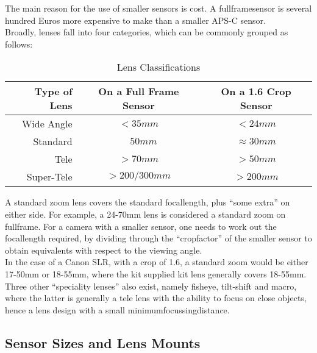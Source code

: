 The main reason for the use of smaller \glspl{sensor} is cost. A \gls{fullframesensor} is several hundred Euros more expensive to make than a smaller \gls{APS-C} \gls{sensor}.
\\[\baselineskip]
Broadly, lenses fall into four categories, which can be commonly grouped as follows:

\begin{table}[htb]
	\centering
		\begin{tabular}{|rcc|}
			\hline
			Type of Lens & On a Full Frame Sensor & On a 1.6 Crop Sensor \\
			\hline
			Wide Angle   & $<35mm$ & $<24mm$ \\
			Standard     & $\quad 50mm$ & $\approx 30mm$ \\
			Tele         & $>70mm$ & $>50mm$ \\
			Super-Tele   & $>200/300mm$ & $>200mm$ \\
			\hline
		\end{tabular}
	\caption{Lens Classifications}
	\label{tab:LensClassifications}
\end{table}

A standard \gls{zoom} lens covers the standard \gls{focallength}, plus ``some extra'' on either side. For example, a 24-70mm lens is considered a standard \gls{zoom} on \gls{fullframe}. For a camera with a smaller \gls{sensor}, one needs to work out the \gls{focallength} required, by dividing through the ``\gls{cropfactor}'' of the smaller \gls{sensor} to obtain equivalents with respect to the viewing angle.
\\
In the case of a Canon \gls{SLR}, with a \gls{crop} of 1.6, a standard \gls{zoom} would be either 17-50mm or 18-55mm, where the kit supplied kit lens generally covers 18-55mm.
\\[\baselineskip]
Three other ``speciality lenses'' also exist, namely fisheye, tilt-shift and macro, where the latter is generally a tele lens with the ability to focus on close objects, hence a lens design with a small \gls{minimumfocussingdistance}.


\subsection{Sensor Sizes and Lens Mounts}


